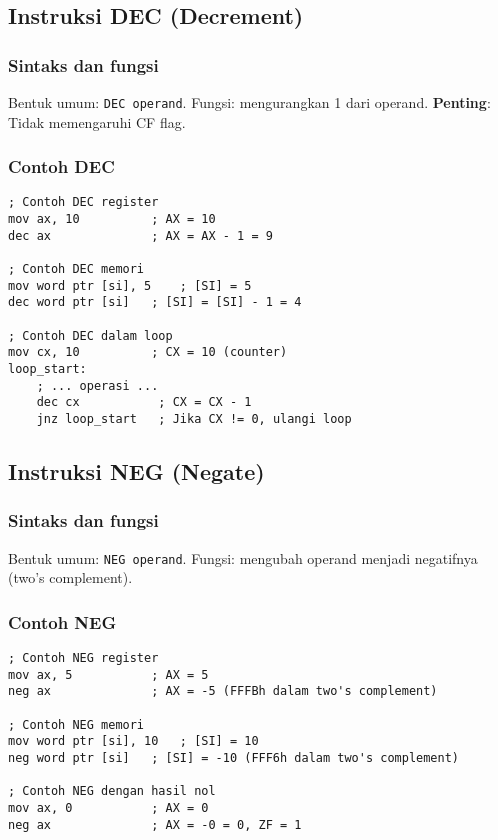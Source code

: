 \documentclass[../main.tex]{subfiles}
\begin{document}
        \subsection{Instruksi DEC (Decrement)}
            \subsubsection{Sintaks dan fungsi}
Bentuk umum: \texttt{DEC operand}. Fungsi: mengurangkan 1 dari operand. \textbf{Penting}: Tidak memengaruhi CF flag.

            \subsubsection{Contoh DEC}
\begin{lstlisting}[language={[x86masm]Assembler}, caption=Instruksi DEC, label={lst:dec-examples}]
; Contoh DEC register
mov ax, 10          ; AX = 10
dec ax              ; AX = AX - 1 = 9

; Contoh DEC memori
mov word ptr [si], 5    ; [SI] = 5
dec word ptr [si]   ; [SI] = [SI] - 1 = 4

; Contoh DEC dalam loop
mov cx, 10          ; CX = 10 (counter)
loop_start:
    ; ... operasi ...
    dec cx           ; CX = CX - 1
    jnz loop_start   ; Jika CX != 0, ulangi loop
\end{lstlisting}

        \subsection{Instruksi NEG (Negate)}
            \subsubsection{Sintaks dan fungsi}
Bentuk umum: \texttt{NEG operand}. Fungsi: mengubah operand menjadi negatifnya (two's complement).

            \subsubsection{Contoh NEG}
\begin{lstlisting}[language={[x86masm]Assembler}, caption=Instruksi NEG, label={lst:neg-examples}]
; Contoh NEG register
mov ax, 5           ; AX = 5
neg ax              ; AX = -5 (FFFBh dalam two's complement)

; Contoh NEG memori
mov word ptr [si], 10   ; [SI] = 10
neg word ptr [si]   ; [SI] = -10 (FFF6h dalam two's complement)

; Contoh NEG dengan hasil nol
mov ax, 0           ; AX = 0
neg ax              ; AX = -0 = 0, ZF = 1
\end{lstlisting}
\end{document}
